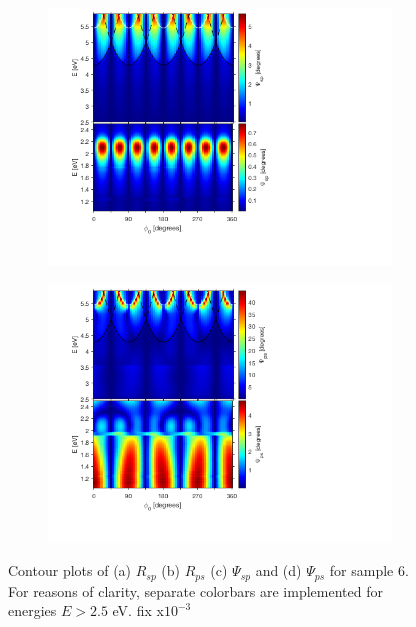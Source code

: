 \begin{figure}[h!]
    \begin{subfigure}{0.5\textwidth}
        \centering
        \includegraphics[width=\linewidth, trim=1.1cm 1.8cm 6.7cm 0.3cm, clip]{figures/ch4/S6/contour/S6_Psisp.png}
        \caption{}
    \end{subfigure}
    \begin{subfigure}{0.5\textwidth}
        \centering
        \includegraphics[width=\linewidth, trim=1.1cm 1.8cm 6.7cm 0.3cm, clip]{figures/ch4/S6/contour/S6_Psips.png}
        \caption{}
    \end{subfigure}
    \caption{Contour plots of (a) $R_{sp}$ (b) $R_{ps}$ (c) $\Psi_{sp}$ and (d) $\Psi_{ps}$ for sample 6. For reasons of clarity, separate colorbars are implemented for energies $E>2.5$ eV. \color{red}fix x$10^{-3}$}
    \label{fig:S6_contour_Rsp&Rps_Psisp&Psips}
\end{figure}

